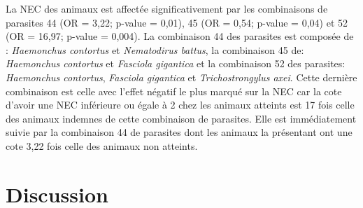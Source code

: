 La NEC des animaux est affectée significativement par les combinaisons de parasites 44 (OR = 3,22; p-value = 0,01), 45 (OR = 0,54; p-value = 0,04) et 52 (OR = 16,97; p-value = 0,004). La combinaison 44 des parasites est composée de : \textit{Haemonchus contortus} et \textit{Nematodirus battus}, la combinaison 45 de: \textit{Haemonchus contortus} et \textit{Fasciola gigantica} et la combinaison 52 des parasites: \textit{Haemonchus contortus}, \textit{Fasciola gigantica} et \textit{Trichostrongylus axei}. Cette dernière combinaison est celle avec l'effet négatif le plus marqué sur la NEC car la cote d'avoir une NEC inférieure ou égale à 2 chez les animaux atteints est 17 fois celle des animaux indemnes de cette combinaison de parasites. Elle est immédiatement suivie par la combinaison 44 de parasites dont les animaux la présentant ont une cote 3,22 fois celle des animaux non atteints. 

\newpage

\section{Discussion}

